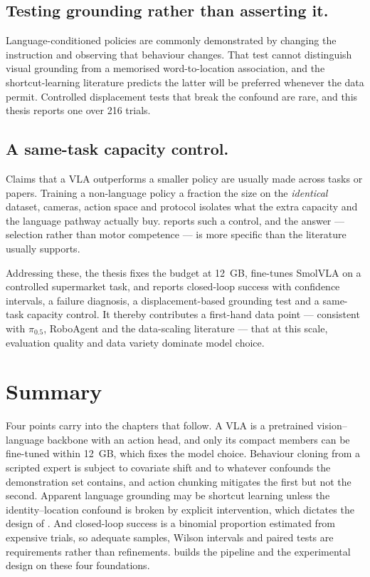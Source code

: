 \subsection{Testing grounding rather than asserting it.} Language-conditioned policies
are commonly demonstrated by changing the instruction and observing that behaviour
changes. That test cannot distinguish visual grounding from a memorised word-to-location
association, and the shortcut-learning literature \parencite{geirhos2020shortcut}
predicts the latter will be preferred whenever the data permit. Controlled displacement
tests that break the confound are rare, and this thesis reports one over 216 trials.

\subsection{A same-task capacity control.} Claims that a VLA outperforms a smaller
policy are usually made across tasks or papers. Training a non-language policy a
fraction the size on the \emph{identical} dataset, cameras, action space and protocol
isolates what the extra capacity and the language pathway actually buy.
 reports such a control, and the answer --- selection rather
than motor competence --- is more specific than the literature usually supports.

Addressing these, the thesis fixes the budget at \SI{12}{GB}, fine-tunes SmolVLA on a
controlled supermarket task, and reports closed-loop success with confidence intervals,
a failure diagnosis, a displacement-based grounding test and a same-task capacity
control. It thereby contributes a first-hand data point --- consistent with $\pi_{0.5}$,
RoboAgent and the data-scaling literature \parencite{black2025pi05,
bharadhwaj2024roboagent, lin2025datascaling} --- that at this scale, evaluation quality
and data variety dominate model choice.

\section{Summary}
\label{sec:bg-summary}
Four points carry into the chapters that follow. A VLA is a pretrained
vision--language backbone with an action head, and only its compact members can be
fine-tuned within \SI{12}{GB}, which fixes the model choice. Behaviour cloning from a
scripted expert is subject to covariate shift and to whatever confounds the
demonstration set contains, and action chunking mitigates the first but not the second.
Apparent language grounding may be shortcut learning unless the identity--location
confound is broken by explicit intervention, which dictates the design of
. And closed-loop success is a binomial proportion estimated
from expensive trials, so adequate samples, Wilson intervals and paired tests are
requirements rather than refinements.  builds the pipeline and
the experimental design on these four foundations.
